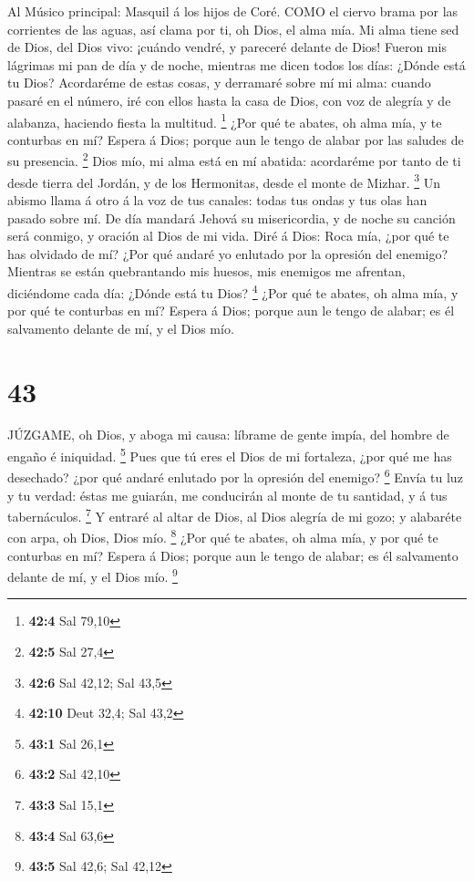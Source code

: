  Al Músico principal: Masquil á los hijos de Coré. COMO el
ciervo brama por las corrientes de las aguas, así clama por ti, oh Dios,
el alma mía.  Mi alma tiene sed de Dios, del Dios vivo:
¡cuándo vendré, y pareceré delante de Dios!  Fueron mis
lágrimas mi pan de día y de noche, mientras me dicen todos los días:
¿Dónde está tu Dios?  Acordaréme de estas cosas, y derramaré
sobre mí mi alma: cuando pasaré en el número, iré con ellos hasta la
casa de Dios, con voz de alegría y de alabanza, haciendo fiesta la
multitud. \footnote{\textbf{42:4} Sal 79,10}  ¿Por qué te
abates, oh alma mía, y te conturbas en mí? Espera á Dios; porque aun le
tengo de alabar por las saludes de su presencia. \footnote{\textbf{42:5}
  Sal 27,4}  Dios mío, mi alma está en mí abatida:
acordaréme por tanto de ti desde tierra del Jordán, y de los Hermonitas,
desde el monte de Mizhar. \footnote{\textbf{42:6} Sal 42,12; Sal 43,5}
 Un abismo llama á otro á la voz de tus canales: todas tus
ondas y tus olas han pasado sobre mí.  De día mandará Jehová
su misericordia, y de noche su canción será conmigo, y oración al Dios
de mi vida.  Diré á Dios: Roca mía, ¿por qué te has olvidado
de mí? ¿Por qué andaré yo enlutado por la opresión del enemigo?
 Mientras se están quebrantando mis huesos, mis enemigos me
afrentan, diciéndome cada día: ¿Dónde está tu Dios? \footnote{\textbf{42:10}
  Deut 32,4; Sal 43,2}  ¿Por qué te abates, oh alma mía, y
por qué te conturbas en mí? Espera á Dios; porque aun le tengo de
alabar; es él salvamento delante de mí, y el Dios mío.

\hypertarget{section-42}{%
\section{43}\label{section-42}}

 JÚZGAME, oh Dios, y aboga mi causa: líbrame de gente impía,
del hombre de engaño é iniquidad. \footnote{\textbf{43:1} Sal 26,1}
 Pues que tú eres el Dios de mi fortaleza, ¿por qué me has
desechado? ¿por qué andaré enlutado por la opresión del enemigo?
\footnote{\textbf{43:2} Sal 42,10}  Envía tu luz y tu
verdad: éstas me guiarán, me conducirán al monte de tu santidad, y á tus
tabernáculos. \footnote{\textbf{43:3} Sal 15,1}  Y entraré
al altar de Dios, al Dios alegría de mi gozo; y alabaréte con arpa, oh
Dios, Dios mío. \footnote{\textbf{43:4} Sal 63,6}  ¿Por qué
te abates, oh alma mía, y por qué te conturbas en mí? Espera á Dios;
porque aun le tengo de alabar; es él salvamento delante de mí, y el Dios
mío. \footnote{\textbf{43:5} Sal 42,6; Sal 42,12}

